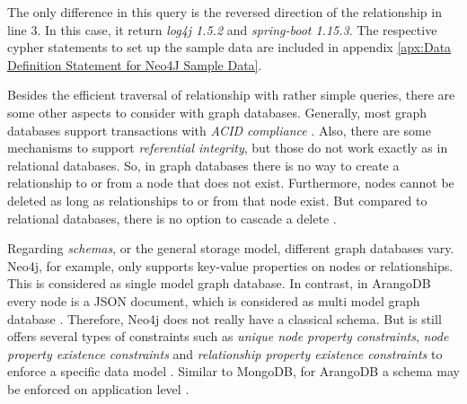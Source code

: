 The only difference in this query is the reversed direction of the relationship in line 3. In this case, it return \emph{log4j 1.5.2} and \emph{spring-boot 1.15.3}. The respective cypher statements to set up the sample data are included in appendix \ref{apx:Data Definition Statement for Neo4J Sample Data}.\par
Besides the efficient traversal of relationship with rather simple queries, there are some other aspects to consider with graph databases. Generally, most graph databases support transactions with \emph{ACID compliance} \cite{neo4jtransactions, arangodbtransactions}. Also, there are some mechanisms to support \emph{referential integrity}, but those do not work exactly as in relational databases. So, in graph databases there is no way to create a relationship to or from a node that does not exist. Furthermore, nodes cannot be deleted as long as relationships to or from that node exist. But compared to relational databases, there is no option to cascade a delete \cite{neo4jdelete}.\par
Regarding \emph{schemas}, or the general storage model, different graph databases vary. Neo4j, for example, only supports key-value properties on nodes or relationships. This is considered as single model graph database. In contrast, in ArangoDB every node is a JSON document, which is considered as multi model graph database \cite{arangodbdocuments}. Therefore, Neo4j does not really have a classical schema. But is still offers several types of constraints such as \emph{unique node property constraints}, \emph{node property existence constraints} and \emph{relationship property existence constraints} to enforce a specific data model \cite{neo4jconstraints}. Similar to MongoDB, for ArangoDB a schema may be enforced on application level \cite{arangodbschema}.

